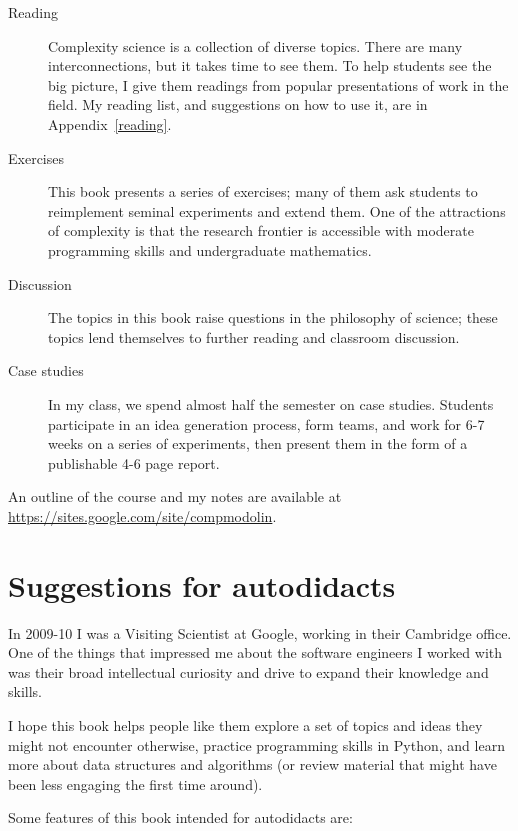 \documentclass[10pt]{book}
\begin{document}
\begin{description}

\item[Reading] Complexity science is a collection of diverse topics.
  There are many interconnections, but it takes time to see them.  To
  help students see the big picture, I give them readings from
  popular presentations of work in the field.  My reading
  list, and suggestions on how to use it, are in
  Appendix~\ref{reading}.

\item[Exercises] This book presents a series of exercises; many of
  them ask students to reimplement seminal experiments and extend
  them.  One of the attractions of complexity is that the
  research frontier is accessible with moderate programming skills and
  undergraduate mathematics.

\item[Discussion] The topics in this book raise questions in the
  philosophy of science; these topics lend themselves to further
  reading and classroom discussion.

\item[Case studies] In my class, we spend almost half the semester on
  case studies.  Students participate in an idea generation process,
  form teams, and work for 6-7 weeks on a series of experiments, then
  present them in the form of a publishable 4-6 page report.

\end{description}

An outline of the course and my notes are available at
\url{https://sites.google.com/site/compmodolin}.

\section{Suggestions for autodidacts}

In 2009-10 I was a Visiting Scientist at Google, working in their
Cambridge office.  One of the things that impressed me about the
software engineers I worked with was their broad intellectual
curiosity and drive to expand their knowledge and skills.

I hope this book helps people like them explore a set of topics
and ideas they might not encounter otherwise, practice programming
skills in Python, and learn more about data structures and
algorithms (or review material that might have been less engaging
the first time around).

Some features of this book intended for autodidacts are:
\end{document}
